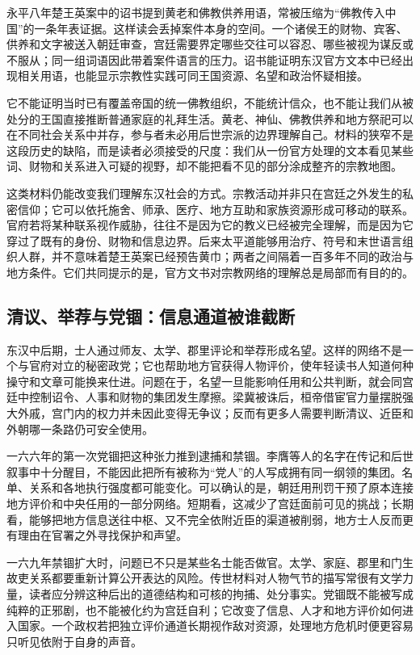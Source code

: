 永平八年楚王英案中的诏书提到黄老和佛教供养用语，常被压缩为“佛教传入中国”的一条年表证据。这样读会丢掉案件本身的空间。一个诸侯王的财物、宾客、供养和文字被送入朝廷审查，宫廷需要界定哪些交往可以容忍、哪些被视为谋反或不服从；同一组词语因此带着案件语言的压力。诏书能证明东汉官方文本中已经出现相关用语，也能显示宗教性实践可同王国资源、名望和政治怀疑相接。

它不能证明当时已有覆盖帝国的统一佛教组织，不能统计信众，也不能让我们从被处分的王国直接推断普通家庭的礼拜生活。黄老、神仙、佛教供养和地方祭祀可以在不同社会关系中并存，参与者未必用后世宗派的边界理解自己。材料的狭窄不是这段历史的缺陷，而是读者必须接受的尺度：我们从一份官方处理的文本看见某些词、财物和关系进入可疑的视野，却不能把看不见的部分涂成整齐的宗教地图。

这类材料仍能改变我们理解东汉社会的方式。宗教活动并非只在宫廷之外发生的私密信仰；它可以依托施舍、师承、医疗、地方互助和家族资源形成可移动的联系。官府若将某种联系视作威胁，往往不是因为它的教义已经被完全理解，而是因为它穿过了既有的身份、财物和信息边界。后来太平道能够用治疗、符号和末世语言组织人群，并不意味着楚王英案已经预告黄巾；两者之间隔着一百多年不同的政治与地方条件。它们共同提示的是，官方文书对宗教网络的理解总是局部而有目的的。

\subsection{清议、举荐与党锢：信息通道被谁截断}

东汉中后期，士人通过师友、太学、郡里评论和举荐形成名望。这样的网络不是一个与官府对立的秘密政党；它也帮助地方官获得人物评价，使年轻读书人知道何种操守和文章可能换来仕进。问题在于，名望一旦能影响任用和公共判断，就会同宫廷中控制诏令、人事和财物的集团发生摩擦。梁冀被诛后，桓帝借宦官力量摆脱强大外戚，宫门内的权力并未因此变得无争议；反而有更多人需要判断清议、近臣和外朝哪一条路仍可安全使用。

一六六年的第一次党锢把这种张力推到逮捕和禁锢。李膺等人的名字在传记和后世叙事中十分醒目，不能因此把所有被称为“党人”的人写成拥有同一纲领的集团。名单、关系和各地执行强度都可能变化。可以确认的是，朝廷用刑罚干预了原本连接地方评价和中央任用的一部分网络。短期看，这减少了宫廷面前可见的挑战；长期看，能够把地方信息送往中枢、又不完全依附近臣的渠道被削弱，地方士人反而更有理由在官署之外寻找保护和声望。

一六九年禁锢扩大时，问题已不只是某些名士能否做官。太学、家庭、郡里和门生故吏关系都要重新计算公开表达的风险。传世材料对人物气节的描写常很有文学力量，读者应分辨这种后出的道德结构和可核的拘捕、处分事实。党锢既不能被写成纯粹的正邪剧，也不能被化约为宫廷自利；它改变了信息、人才和地方评价如何进入国家。一个政权若把独立评价通道长期视作敌对资源，处理地方危机时便更容易只听见依附于自身的声音。

